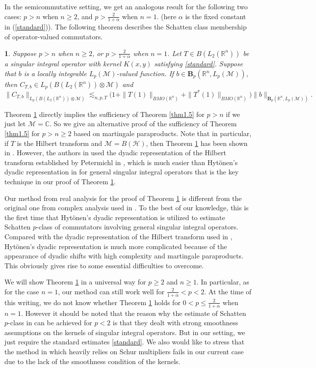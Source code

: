 \documentclass[oneside,english,a4wide]{amsart}
\numberwithin{equation}{section}
\numberwithin{figure}{section}
\theoremstyle{plain}
\newtheorem{thm}{\protect\theoremname}[section]
\theoremstyle{plain}
\theoremstyle{definition}
\theoremstyle{plain}
\theoremstyle{remark}
\theoremstyle{definition}
\theoremstyle{remark}
\theoremstyle{definition}
\providecommand{\theoremname}{Theorem}
\newcommand{\M}{{\mathcal M}}
\newcommand{\8}{\infty}
\begin{document}
 In the semicommutative setting, we get an analogous result for the following two cases:  $p>n$ when $n\geq 2$, and $p>\frac{2}{1+\alpha}$ when $n=1$. (here $\alpha$ is the fixed constant in (\ref{standard})). The following theorem describes the Schatten class membership of operator-valued commutators.
 \begin{thm}\label{thm6.4}
 	Suppose $p>n$ when $n\geq 2$, or $p>\frac{2}{1+\alpha}$ when $n=1$. Let $T\in B(L_2(\mathbb{R}^n))$ be a singular integral operator with kernel $K(x,y)$ satisfying \eqref{standard}. Suppose that $b$ is a locally integrable $L_p(\M)$-valued function. If $b\in \pmb{B}_p(\mathbb{R}^n, L_p(\mathcal{M}))$, then $ C_{T, b}\in L_p(B(L_2(\mathbb{R}^n))\otimes \mathcal{M})$ and 
 	$$ \| C_{T, b}\|_{L_p(B(L_2(\mathbb{R}^n))\otimes \mathcal{M})}\lesssim_{n, p,T}\big(1+\|T(1)\|_{BMO(\mathbb{R}^n)}+\|T^*(1)\|_{BMO(\mathbb{R}^n)}\big)\|b\|_{\pmb{B}_p(\mathbb{R}^n, L_p(\mathcal{M}))}. $$
 \end{thm}

 Theorem \ref{thm6.4} directly implies the sufficiency of Theorem \ref{thm1.5} for $p>n$ if we just let $\M=\mathbb{C}$. So we give an alternative proof of the sufficiency of Theorem \ref{thm1.5} for $p>n\geq 2$ based on martingale paraproducts. Note that in particular, if $T$ is the Hilbert transform and $\M=B(\mathcal{H})$, then Theorem \ref{thm6.4} has been shown in \cite{PS}. However, the authors in \cite{PS} used the dyadic representation of the Hilbert transform established by Petermichl in \cite{SPe}, which is much easier than Hyt\"{o}nen's dyadic representation in \cite{TH1} for general singular integral operators that is the key technique in our proof of Theorem \ref{thm6.4}.
 
Our method from real analysis for the proof of Theorem \ref{thm6.4} is different from the original one from complex analysis used in \cite{V1}. To the best of our knowledge, this is the first time that Hyt\"{o}nen's dyadic representation is utilized to estimate Schatten $p$-class of commutators involving general singular integral operators. Compared with the dyadic representation of the Hilbert transform used in \cite{PS}, Hyt\"{o}nen's dyadic representation is much more complicated because of the appearance of dyadic shifts with high complexity and martingale paraproducts. This obviously gives rise to some essential difficulties to overcome.
 
 We will show Theorem \ref{thm6.4} in a universal way for $p\geq 2$ and $n\geq 1$. In particular, as for the case $n=1$, our method can still work well for $\frac{2}{1+\alpha}<p<2$. At the time of this writing, we do not know whether Theorem \ref{thm6.4} holds for $0<p\leq\frac{2}{1+\alpha}$ when $n=1$. However it should be noted that the reason why the estimate of Schatten $p$-class in \cite{V1, FLLX2024} can be achieved for $p<2$ is that they dealt with strong smoothness assumptions on the kernels of singular integral operators. But in our setting, we just require the standard estimates \eqref{standard}. We also would like to stress that the method in \cite{JPe} which heavily relies on Schur multipliers fails  in our current case due to the lack of the smoothness condition of the kernels.
 
\end{document}
